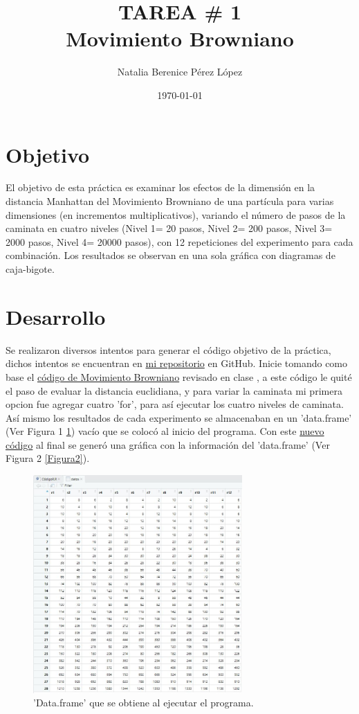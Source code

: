 \documentclass{article}
\title{TAREA \# 1 \\ Movimiento Browniano} %
\author{Natalia Berenice P\'{e}rez L\'{o}pez} %
\date{\today}
\begin{document}

\maketitle %

\section{Objetivo}
El objetivo de esta práctica es examinar los efectos de la dimensión en la distancia Manhattan del Movimiento Browniano de una partícula para varias dimensiones (en incrementos multiplicativos), variando el número de pasos de la caminata en cuatro niveles (Nivel 1= 20 pasos, Nivel 2= 200 pasos, Nivel 3= 2000 pasos, Nivel 4= 20000 pasos), con 12 repeticiones del experimento para cada combinación. Los resultados se observan en una sola gráfica con diagramas de caja-bigote.

\section{Desarrollo} %
Se realizaron diversos intentos para generar el código objetivo de la práctica, dichos intentos se encuentran en \href{https://github.com/nataliaperez0/Simulation/tree/main/Tarea1/}{mi repositorio}  en GitHub. Inicie tomando como base el \href{https://github.com/satuelisa/Simulation/blob/master/BrownianMotion/brownian.R}{código de Movimiento Browniano} revisado en clase \citep{1}, a este código le quité el paso de evaluar la distancia euclidiana, y para variar la caminata mi primera opcion fue agregar cuatro 'for', para así ejecutar los cuatro niveles de caminata. Así mismo los resultados de cada experimento se almacenaban en un 'data.frame' (Ver Figura 1 \ref{Figura1}) vacío que se colocó al inicio del programa. Con este \href{https://github.com/nataliaperez0/Simulation/blob/main/Tarea1/Pruebas%20de%20codigo/Intento%208.R}{nuevo código}  al final se generó una gráfica con la información del 'data.frame' (Ver Figura 2 \ref{Figura2}).

\begin{figure} [h!]%
    \centering
    \includegraphics[width=80mm]{Figura1.jpg} %
    \caption{'Data.frame' que se obtiene al ejecutar el programa.}
    \label{Figura1}
\end{figure}
\end{document}
